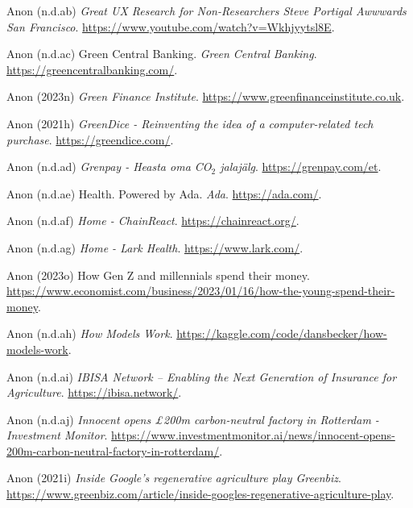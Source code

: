 \documentclass[
  letterpaper,
  DIV=11,
  numbers=noendperiod]{scrartcl}
\newlength{\cslhangindent}
\newenvironment{CSLReferences}[2] %
 {\begin{list}{}{%
  \setlength{\itemindent}{0pt}
  \setlength{\leftmargin}{0pt}
  \setlength{\parsep}{0pt}
  \ifodd #1
   \setlength{\leftmargin}{\cslhangindent}
   \setlength{\itemindent}{-1\cslhangindent}
  \fi
  \setlength{\itemsep}{#2\baselineskip}}}
 {\end{list}}
\begin{document}
\begin{CSLReferences}{0}{1}
Anon (n.d.ab) \emph{Great {UX Research} for {Non-Researchers} {\textbar}
{Steve Portigal} {\textbar} {Awwwards San Francisco}}.
\url{https://www.youtube.com/watch?v=Wkhjyytsl8E}.

Anon (n.d.ac) Green {Central Banking}. \emph{Green Central Banking}.
\url{https://greencentralbanking.com/}.

Anon (2023n) \emph{Green {Finance Institute}}.
\url{https://www.greenfinanceinstitute.co.uk}.

Anon (2021h) \emph{{GreenDice} - {Reinventing} the idea of a
computer-related tech purchase}. \url{https://greendice.com/}.

Anon (n.d.ad) \emph{Grenpay - {Heasta} oma {CO}{\(_2\)} jalaj{ä}lg}.
\url{https://grenpay.com/et}.

Anon (n.d.ae) Health. {Powered} by {Ada}. \emph{Ada}.
\url{https://ada.com/}.

Anon (n.d.af) \emph{Home - {ChainReact}}. \url{https://chainreact.org/}.

Anon (n.d.ag) \emph{Home - {Lark Health}}. \url{https://www.lark.com/}.

Anon (2023o) How {Gen Z} and millennials spend their money.
\url{https://www.economist.com/business/2023/01/16/how-the-young-spend-their-money}.

Anon (n.d.ah) \emph{How {Models Work}}.
\url{https://kaggle.com/code/dansbecker/how-models-work}.

Anon (n.d.ai) \emph{{IBISA Network} -- {Enabling} the {Next Generation}
of {Insurance} for {Agriculture}}. \url{https://ibisa.network/}.

Anon (n.d.aj) \emph{Innocent opens {£}200m carbon-neutral factory in
{Rotterdam} - {Investment Monitor}}.
\url{https://www.investmentmonitor.ai/news/innocent-opens-200m-carbon-neutral-factory-in-rotterdam/}.

Anon (2021i) \emph{Inside {Google}'s regenerative agriculture play
{\textbar} {Greenbiz}}.
\url{https://www.greenbiz.com/article/inside-googles-regenerative-agriculture-play}.


\end{CSLReferences}
\end{document}
